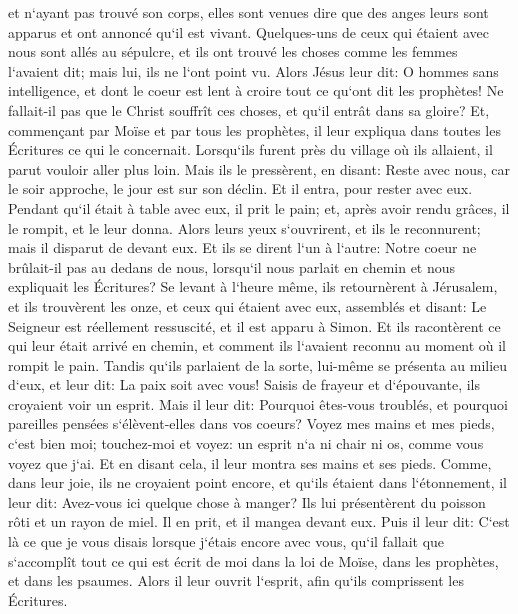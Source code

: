 \verse et n`ayant pas trouvé son corps, elles sont venues dire que des anges leurs sont apparus et ont annoncé qu`il est vivant. 
\verse Quelques-uns de ceux qui étaient avec nous sont allés au sépulcre, et ils ont trouvé les choses comme les femmes l`avaient dit; mais lui, ils ne l`ont point vu. 
\verse Alors Jésus leur dit: O hommes sans intelligence, et dont le coeur est lent à croire tout ce qu`ont dit les prophètes! 
\verse Ne fallait-il pas que le Christ souffrît ces choses, et qu`il entrât dans sa gloire? 
\verse Et, commençant par Moïse et par tous les prophètes, il leur expliqua dans toutes les Écritures ce qui le concernait. 
\verse Lorsqu`ils furent près du village où ils allaient, il parut vouloir aller plus loin. 
\verse Mais ils le pressèrent, en disant: Reste avec nous, car le soir approche, le jour est sur son déclin. Et il entra, pour rester avec eux. 
\verse Pendant qu`il était à table avec eux, il prit le pain; et, après avoir rendu grâces, il le rompit, et le leur donna. 
\verse Alors leurs yeux s`ouvrirent, et ils le reconnurent; mais il disparut de devant eux. 
\verse Et ils se dirent l`un à l`autre: Notre coeur ne brûlait-il pas au dedans de nous, lorsqu`il nous parlait en chemin et nous expliquait les Écritures? 
\verse Se levant à l`heure même, ils retournèrent à Jérusalem, et ils trouvèrent les onze, et ceux qui étaient avec eux, assemblés 
\verse et disant: Le Seigneur est réellement ressuscité, et il est apparu à Simon. 
\verse Et ils racontèrent ce qui leur était arrivé en chemin, et comment ils l`avaient reconnu au moment où il rompit le pain. 
\verse Tandis qu`ils parlaient de la sorte, lui-même se présenta au milieu d`eux, et leur dit: La paix soit avec vous! 
\verse Saisis de frayeur et d`épouvante, ils croyaient voir un esprit. 
\verse Mais il leur dit: Pourquoi êtes-vous troublés, et pourquoi pareilles pensées s`élèvent-elles dans vos coeurs? 
\verse Voyez mes mains et mes pieds, c`est bien moi; touchez-moi et voyez: un esprit n`a ni chair ni os, comme vous voyez que j`ai. 
\verse Et en disant cela, il leur montra ses mains et ses pieds. 
\verse Comme, dans leur joie, ils ne croyaient point encore, et qu`ils étaient dans l`étonnement, il leur dit: Avez-vous ici quelque chose à manger? 
\verse Ils lui présentèrent du poisson rôti et un rayon de miel. 
\verse Il en prit, et il mangea devant eux. 
\verse Puis il leur dit: C`est là ce que je vous disais lorsque j`étais encore avec vous, qu`il fallait que s`accomplît tout ce qui est écrit de moi dans la loi de Moïse, dans les prophètes, et dans les psaumes. 
\verse Alors il leur ouvrit l`esprit, afin qu`ils comprissent les Écritures. 
